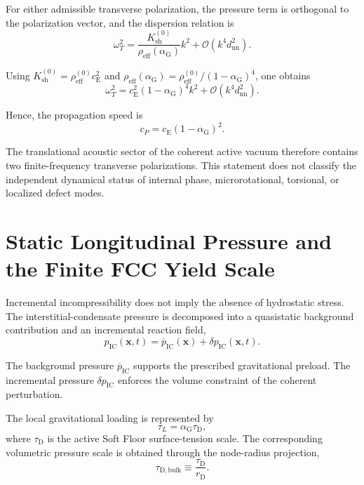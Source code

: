 For either admissible transverse polarization, the pressure term is orthogonal to the polarization vector, and the dispersion relation is
\begin{equation}
    \omega_T^2 = \frac{ K_{\mathrm{sh}}^{(0)} }{ \rho_{\mathrm{eff}}(\alpha_{\mathrm{G}}) } k^2 + \mathcal{O}(k^4d_{\mathrm{nn}}^2).
\end{equation}

Using $K_{\mathrm{sh}}^{(0)} = \rho_{\mathrm{eff}}^{(0)}c_{\mathrm{E}}^2$ and $\rho_{\mathrm{eff}}(\alpha_{\mathrm{G}}) = \rho_{\mathrm{eff}}^{(0)} / (1-\alpha_{\mathrm{G}})^4$, one obtains
\begin{equation}
    \omega_T^2 = c_{\mathrm{E}}^2 (1-\alpha_{\mathrm{G}})^4 k^2 + \mathcal{O}(k^4d_{\mathrm{nn}}^2).
\end{equation}

Hence, the propagation speed is
\begin{equation}
    \boxed{ c_P = c_{\mathrm{E}} (1-\alpha_{\mathrm{G}})^2 }.
\end{equation}

The translational acoustic sector of the coherent active vacuum therefore contains two finite-frequency transverse polarizations. This statement does not classify the independent dynamical status of internal phase, microrotational, torsional, or localized defect modes.

\section{Static Longitudinal Pressure and the Finite FCC Yield Scale}

Incremental incompressibility does not imply the absence of hydrostatic stress. The interstitial-condensate pressure is decomposed into a quasistatic background contribution and an incremental reaction field,
\begin{equation}
    p_{\mathrm{IC}}(\mathbf{x},t) = \overline{p}_{\mathrm{IC}}(\mathbf{x}) + \delta p_{\mathrm{IC}}(\mathbf{x},t).
\end{equation}

The background pressure $\overline{p}_{\mathrm{IC}}$ supports the prescribed gravitational preload. The incremental pressure $\delta p_{\mathrm{IC}}$ enforces the volume constraint of the coherent perturbation.

The local gravitational loading is represented by
\begin{equation}
    \tau_L = \alpha_{\mathrm{G}}\tau_{\mathrm{D}},
\end{equation}
where $\tau_{\mathrm{D}}$ is the active Soft Floor surface-tension scale. The corresponding volumetric pressure scale is obtained through the node-radius projection,
\begin{equation}
    \tau_{\mathrm{D,bulk}} \equiv \frac{\tau_{\mathrm{D}}}{r_{\mathrm{D}}}.
\end{equation}

